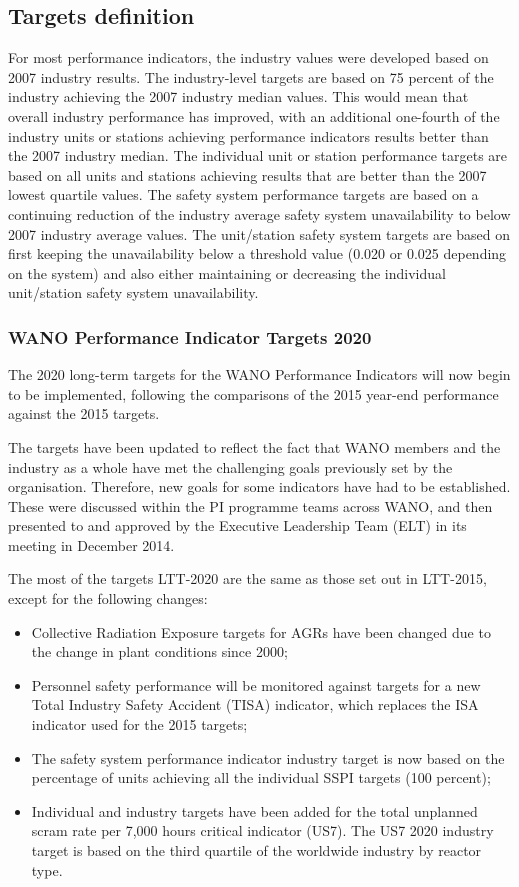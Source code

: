 \documentclass{article}
\begin{document}


\appendix
\subsection*{Targets definition}

For most performance indicators, the industry values were developed based on 2007 industry results. The industry-level targets are based on 75 percent of the industry achieving the 2007 industry median values. This would mean that overall industry performance has improved, with an additional one-fourth of the industry units or stations achieving performance indicators results better than the 2007 industry median. The individual unit or station performance targets are based on all units and stations achieving results that are better than the 2007 lowest quartile values.
The safety system performance targets are based on a continuing reduction of the industry average safety system unavailability to below 2007 industry average values. The unit/station safety system targets are based on first keeping the unavailability below a threshold value (0.020 or 0.025 depending on the system) and also either maintaining or decreasing the individual unit/station safety system unavailability.

\subsubsection*{WANO Performance Indicator Targets 2020}

The 2020 long-term targets for the WANO Performance Indicators will now begin to be implemented, following the comparisons of the 2015 year-end performance against the 2015 targets.

The targets have been updated to reflect the fact that WANO members and the industry as a whole have met the challenging goals previously set by the organisation. Therefore, new goals for some indicators have had to be established. These were discussed within the PI programme teams across WANO, and then presented to and approved by the Executive Leadership Team (ELT) in its meeting in December 2014.

The most of the targets LTT-2020 are the same as those set out in LTT-2015, except for the following changes:
\begin{itemize}
\item{Collective Radiation Exposure targets for AGRs have been changed due to the change in plant conditions since 2000;}
\item{Personnel safety performance will be monitored against targets for a new Total Industry Safety Accident (TISA) indicator, which replaces the ISA indicator used for the 2015 targets;}
\item{The safety system performance indicator industry target is now based on the percentage of units achieving all the individual SSPI targets (100 percent);}
\item{Individual and industry targets have been added for the total unplanned scram rate per 7,000 hours critical indicator (US7). The US7 2020 industry target is based on the third quartile of the worldwide industry by reactor type.}
\end{itemize}
\end{document}
